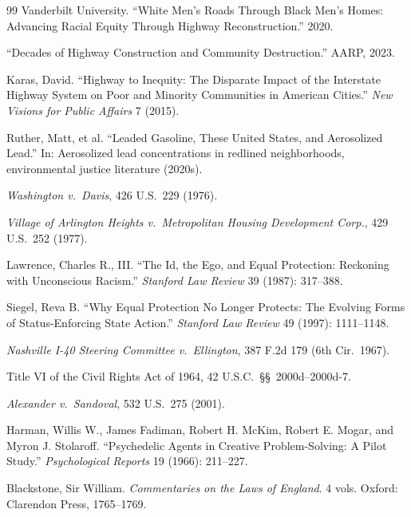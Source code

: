 \documentclass[12pt,openany]{book}
\begin{document}
\begin{thebibliography}{99}
Vanderbilt University. ``White Men's Roads Through Black Men's Homes: Advancing Racial Equity Through Highway Reconstruction.'' 2020.

``Decades of Highway Construction and Community Destruction.'' AARP, 2023.

Karas, David. ``Highway to Inequity: The Disparate Impact of the Interstate Highway System on Poor and Minority Communities in American Cities.'' \textit{New Visions for Public Affairs} 7 (2015).

Ruther, Matt, et al. ``Leaded Gasoline, These United States, and Aerosolized Lead.'' In: Aerosolized lead concentrations in redlined neighborhoods, environmental justice literature (2020s).


\textit{Washington v.\ Davis}, 426 U.S.\ 229 (1976).

\textit{Village of Arlington Heights v.\ Metropolitan Housing Development Corp.}, 429 U.S.\ 252 (1977).

Lawrence, Charles R., III. ``The Id, the Ego, and Equal Protection: Reckoning with Unconscious Racism.'' \textit{Stanford Law Review} 39 (1987): 317--388.

Siegel, Reva B. ``Why Equal Protection No Longer Protects: The Evolving Forms of Status-Enforcing State Action.'' \textit{Stanford Law Review} 49 (1997): 1111--1148.

\textit{Nashville I-40 Steering Committee v.\ Ellington}, 387 F.2d 179 (6th Cir.\ 1967).

Title VI of the Civil Rights Act of 1964, 42 U.S.C.\ \S\S~2000d--2000d-7.

\textit{Alexander v.\ Sandoval}, 532 U.S.\ 275 (2001).

Harman, Willis W., James Fadiman, Robert H. McKim, Robert E. Mogar, and Myron J. Stolaroff. ``Psychedelic Agents in Creative Problem-Solving: A Pilot Study.'' \textit{Psychological Reports} 19 (1966): 211--227.


Blackstone, Sir William. \textit{Commentaries on the Laws of England}. 4 vols. Oxford: Clarendon Press, 1765--1769.


\end{thebibliography}
\end{document}
